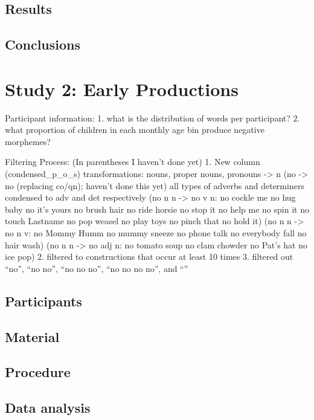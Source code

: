 \documentclass[man]{apa6}
\begin{document}
\subsection{Results}\label{results}

\subsection{Conclusions}\label{conclusions}

\section{Study 2: Early Productions}\label{study-2-early-productions}

Participant information: 1. what is the distribution of words per
participant? 2. what proportion of children in each monthly age bin
produce negative morphemes?

Filtering Process: (In parentheses I haven't done yet) 1. New column
(condensed\_p\_o\_s) transformations: nouns, proper nouns, pronouns
-\textgreater{} n (no -\textgreater{} no (replacing co/qn); haven't done
this yet) all types of adverbs and determiners condensed to adv and det
respectively (no n n -\textgreater{} no v n: no cockle me no hug baby no
it's yours no brush hair no ride horsie no stop it no help me no spin it
no touch Lastname no pop weasel no play toys no pinch that no hold it)
(no n n -\textgreater{} no n v: no Mommy Humm no mummy sneeze no phone
talk no everybody fall no hair wash) (no n n -\textgreater{} no adj n:
no tomato soup no clam chowder no Pat's hat no ice pop) 2. filtered to
constructions that occur at least 10 times 3. filtered out \enquote{no},
\enquote{no no}, \enquote{no no no}, \enquote{no no no no}, and
\enquote{}

\subsection{Participants}\label{participants}

\subsection{Material}\label{material}

\subsection{Procedure}\label{procedure-1}

\subsection{Data analysis}\label{data-analysis}
\end{document}

